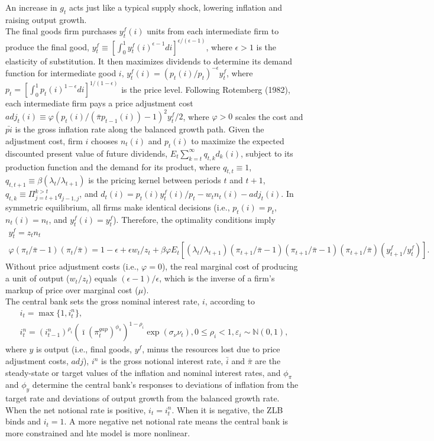 \documentclass[12pt, final]{article}
\begin{document}
An increase in $g_t$ acts just like a typical supply shock, lowering inflation and raising output growth.\\
The final goods firm purchases $y_t^f(i)$ units from each intermediate firm to produce the final good, $y_t^f \equiv [\int_0^1 y_t^f(i)^{\epsilon - 1}di]^{\epsilon/(\epsilon - 1)}$, where $\epsilon > 1$ is the elasticity of substitution. It then maximizes dividends to determine its demand function for intermediate good $i$, $y_t^f(i) = (p_t(i)/p_t)^{-\epsilon}y_t^f$, where $p_t = [\int_0^1p_t(i)^{1-\epsilon}di]^{1/(1-\epsilon)}$ is the price level. Following Rotemberg (1982), each intermediate firm pays a price adjustment cost $adj_t(i) \equiv \varphi(p_t(i)/(\bar{\pi}p_{t-1}(i))-1)^2y_t^f/2$, where $\varphi>0$ scales the cost and $\bar{pi}$ is the gross inflation rate along the balanced growth path. Given the adjustment cost, firm $i$ chooses $n_t(i)$ and $p_t(i)$ to maximize the expected discounted present value of future dividends, $E_t\sum_{k=t}^\infty q_{t,k}d_k(i)$, subject to its production function and the demand for its product, where $q_{t,t} \equiv 1$, $q_{t,t+1} \equiv \beta(\lambda_t/\lambda_{t+1})$ is the pricing kernel between periods $t$ and $t+1$, $q_{t,k} \equiv \Pi_{j=t+1}^{k>t} q_{j-1,j}$, and $d_t(i) = p_t(i)y_t^f(i)/p_t - w_tn_t(i) - adj_t(i)$. In symmetric equilibrium, all firms make identical decisions (i.e., $p_t(i) = p_t$, $n_t(i) = n_t$, and $y_t^f(i) = y_t^f$). Therefore, the optimality conditions imply
    \begin{gather}
      y_t^f = z_tn_t\\
      \varphi(\pi_t/\bar{\pi}-1)(\pi_t/\bar{\pi}) = 1 - \epsilon + \epsilon w_t/z_t + \beta\varphi E_t[(\lambda_t/\lambda_{t+1})(\pi_{t+1}/\bar{\pi} - 1)(\pi_{t+1}/\bar{\pi}-1)(\pi_{t+1}/\bar{\pi})(y^f_{t+1}/y_t^f)].
      \end{gather}
    Without price adjustment costs (i.e., $\varphi = 0$), the real marginal cost of producing a unit of output ($w_t/z_t$) equals $(\epsilon-1)/\epsilon$, which is the inverse of a firm's markup of price over marginal cost ($\mu$). \\
    The central bank sets the gross nominal interest rate, $i$, according to
    \begin{gather}
      i_t = \max\{1, i_t^n\},\\
      i_t^n=(i^n_{t-1})^{\rho_i}(\bar{\imath}(\pi_t^{gap})^{\phi_\pi})^{1-\rho_i}\exp(\sigma_\nu\nu_t), 0 \leq \rho_i < 1, \varepsilon_i \sim \mathbb{N}(0,1),
    \end{gather}
    where $y$ is output (i.e., final goods, $y^f$, minus the resources lost due to price adjustment costs, $adj$), $i^n$ is the gross notional interest rate, $\bar{i}$ and $\bar{\pi}$ are the steady-state or target values of the inflation and nominal interest rates, and $\phi_\pi$ and $\phi_y$ determine the central bank's responses to deviations of inflation from the target rate and deviations of output growth from the balanced growth rate. When the net notional rate is positive, $i_t = i^n_t$. When it is negative, the ZLB binds and $i_t = 1$. A more negative net notional rate means the central bank is more constrained and hte model is more nonlinear. \\
\end{document}
